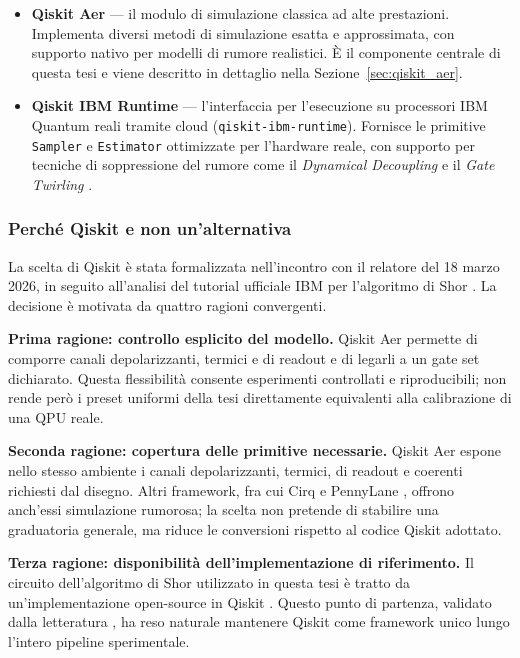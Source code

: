 \begin{onehalfspace}
\begin{itemize}
    \item \textbf{Qiskit Aer} — il modulo di simulazione classica ad alte prestazioni. Implementa diversi metodi di simulazione esatta e approssimata, con supporto nativo per modelli di rumore realistici. È il componente centrale di questa tesi e viene descritto in dettaglio nella Sezione~\ref{sec:qiskit_aer}.

    \item \textbf{Qiskit IBM Runtime} — l'interfaccia per l'esecuzione su processori \ac{IBM} Quantum reali tramite cloud (\texttt{qiskit-ibm-runtime}). Fornisce le primitive \texttt{Sampler} e \texttt{Estimator} ottimizzate per l'hardware reale, con supporto per tecniche di soppressione del rumore come il \textit{Dynamical Decoupling} e il \textit{Gate Twirling} \cite{ibm_shor_tutorial}.

\end{itemize}

\subsubsection{Perché Qiskit e non un'alternativa}
\label{sec:confronto_framework}

La scelta di Qiskit è stata formalizzata nell'incontro con il relatore del 18 marzo 2026, in seguito all'analisi del tutorial ufficiale \ac{IBM} per l'algoritmo di Shor \cite{ibm_shor_tutorial}. La decisione è motivata da quattro ragioni convergenti.

\textbf{Prima ragione: controllo esplicito del modello.} Qiskit Aer permette di comporre canali depolarizzanti, termici e di readout e di legarli a un gate set dichiarato. Questa flessibilità consente esperimenti controllati e riproducibili; non rende però i preset uniformi della tesi direttamente equivalenti alla calibrazione di una QPU reale.

\textbf{Seconda ragione: copertura delle primitive necessarie.} Qiskit Aer espone nello stesso ambiente i canali depolarizzanti, termici, di readout e coerenti richiesti dal disegno. Altri framework, fra cui Cirq \cite{cirq2024} e PennyLane \cite{pennylane2022}, offrono anch'essi simulazione rumorosa; la scelta non pretende di stabilire una graduatoria generale, ma riduce le conversioni rispetto al codice Qiskit adottato.

\textbf{Terza ragione: disponibilità dell'implementazione di riferimento.} Il circuito dell'algoritmo di Shor utilizzato in questa tesi è tratto da un'implementazione open-source in Qiskit \cite{github_shor}. Questo punto di partenza, validato dalla letteratura \cite{skosana2021}, ha reso naturale mantenere Qiskit come framework unico lungo l'intero pipeline sperimentale.


\end{onehalfspace}

